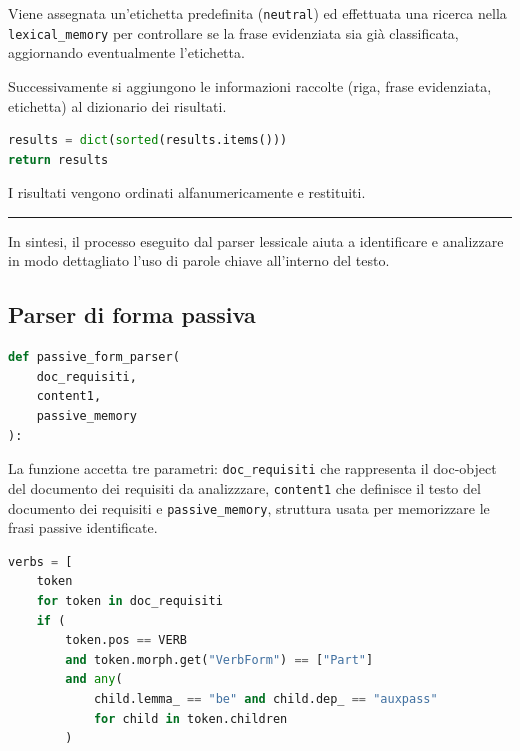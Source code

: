 \documentclass[12pt]{report}
\begin{document}
\noindent Viene assegnata un'etichetta predefinita (\texttt{neutral}) ed effettuata una ricerca nella \texttt{lexical\_memory} per controllare se la frase evidenziata sia già classificata, aggiornando eventualmente l'etichetta.

Successivamente si aggiungono le informazioni raccolte (riga, frase evidenziata, etichetta) al dizionario dei risultati.


\begin{mdframed}
\small
\begin{lstlisting}[language=Python]
results = dict(sorted(results.items()))
return results
\end{lstlisting}
\end{mdframed}

\noindent I risultati vengono ordinati alfanumericamente e restituiti.

{\centering \rule{0.5\linewidth}{0.1pt} \par\vspace{0.25cm}}

In sintesi, il processo eseguito dal \textsf{parser lessicale} aiuta a identificare e analizzare in modo dettagliato l’uso di parole chiave all’interno del testo.


\subsection{Parser di forma passiva}

\begin{mdframed}
\small
\begin{lstlisting}[language=Python]
def passive_form_parser(
    doc_requisiti,
    content1,
    passive_memory
):
\end{lstlisting}
\end{mdframed}

\noindent La funzione accetta tre parametri: \texttt{doc\_requisiti} che rappresenta il doc-object del documento dei requisiti da analizzzare, \texttt{content1} che definisce il testo del documento dei requisiti e \texttt{passive\_memory}, struttura usata per memorizzare le frasi passive identificate.


\begin{mdframed}
\small
\begin{lstlisting}[language=Python]
verbs = [
    token
    for token in doc_requisiti
    if (
        token.pos == VERB
        and token.morph.get("VerbForm") == ["Part"]
        and any(
            child.lemma_ == "be" and child.dep_ == "auxpass"
            for child in token.children
        )
\end{lstlisting}
\end{mdframed}
\end{document}
